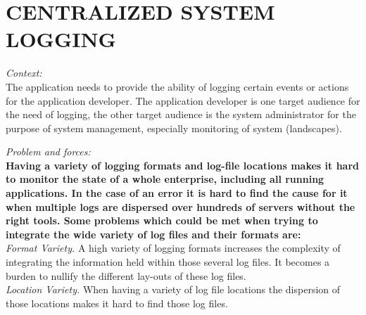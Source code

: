 \newpage
\section*{CENTRALIZED SYSTEM LOGGING}



\textit{Context:}\\
The application needs to provide the ability of logging certain events or actions for the application developer. The application developer is one target audience for the need of logging, the other target audience is the system administrator for the purpose of system management, especially monitoring of system (landscapes).

\begin{center}
  
\end{center}

\textit{Problem and forces:\\}
\textbf{Having a variety of logging formats and log-file locations makes it hard to monitor the state of a whole enterprise, including all running applications. In the case of an error it is hard to find the cause for it when multiple logs are dispersed over hundreds of servers without the right tools. Some problems which could be met when trying to integrate the wide variety of log files and their formats are:}\\

\textit{Format Variety.} A high variety of logging formats increases the complexity of integrating the information held within those several log files. It becomes a burden to nullify
the different lay-outs of these log files.\\ 

\textit{Location Variety.} When having a variety of log file locations the dispersion of those locations makes it hard to find those log files.\\

